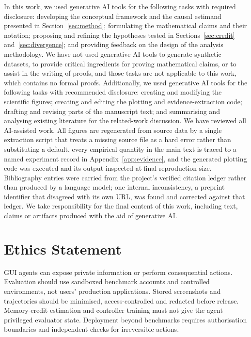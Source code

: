 \documentclass{article}
\begin{document}
In this work, we used generative AI tools for the following tasks with required
disclosure: developing the conceptual framework and the causal estimand
presented in Section~\ref{sec:method}; formulating the mathematical claims and
their notation; proposing and refining the hypotheses tested in
Sections~\ref{sec:credit} and~\ref{sec:divergence}; and providing feedback on
the design of the analysis methodology. We have not used generative AI tools to
generate synthetic datasets, to provide critical ingredients for proving
mathematical claims, or to assist in the writing of proofs, and those tasks are
not applicable to this work, which contains no formal proofs. Additionally, we
used generative AI tools for the following tasks with recommended disclosure:
creating and modifying the scientific figures; creating and editing the plotting
and evidence-extraction code; drafting and revising parts of the manuscript
text; and summarising and analysing existing literature for the related-work
discussion. We have reviewed all AI-assisted work. All figures are regenerated
from source data by a single extraction script that treats a missing source file
as a hard error rather than substituting a default, every empirical quantity in
the main text is traced to a named experiment record in
Appendix~\ref{app:evidence}, and the generated plotting code was executed and its
output inspected at final reproduction size. Bibliography entries were carried
from the project's verified citation ledger rather than produced by a language
model; one internal inconsistency, a preprint identifier that disagreed with its
own URL, was found and corrected against that ledger. We take responsibility for
the final content of this work, including text, claims or artifacts produced
with the aid of generative AI.

\section*{Ethics Statement}
GUI agents can expose private information or perform consequential actions.
Evaluation should use sandboxed benchmark accounts and controlled environments,
not users' production applications. Stored screenshots and trajectories should be
minimised, access-controlled and redacted before release. Memory-credit
estimation and controller training must not give the agent privileged evaluator
state. Deployment beyond benchmarks requires authorisation boundaries and
independent checks for irreversible actions.
\end{document}
